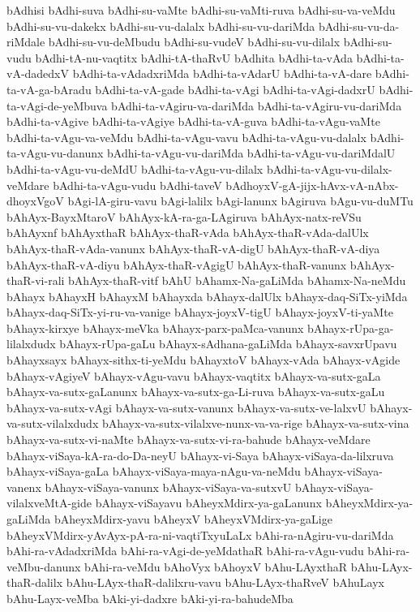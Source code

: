 {bAdhisi
bAdhi-suva
bAdhi-su-vaMte
bAdhi-su-vaMti-ruva
bAdhi-su-va-veMdu
bAdhi-su-vu-dakekx
bAdhi-su-vu-dalalx
bAdhi-su-vu-dariMda
bAdhi-su-vu-da-riMdale
bAdhi-su-vu-deMbudu
bAdhi-su-vudeV
bAdhi-su-vu-dilalx
bAdhi-su-vudu
bAdhi-tA-nu-vaqtitx
bAdhi-tA-thaRvU
bAdhita
bAdhi-ta-vAda
bAdhi-ta-vA-dadedxV
bAdhi-ta-vAdadxriMda
bAdhi-ta-vAdarU
bAdhi-ta-vA-dare
bAdhi-ta-vA-ga-bAradu
bAdhi-ta-vA-gade
bAdhi-ta-vAgi
bAdhi-ta-vAgi-dadxrU
bAdhi-ta-vAgi-de-yeMbuva
bAdhi-ta-vAgiru-va-dariMda
bAdhi-ta-vAgiru-vu-dariMda
bAdhi-ta-vAgive
bAdhi-ta-vAgiye
bAdhi-ta-vA-guva
bAdhi-ta-vAgu-vaMte
bAdhi-ta-vAgu-va-veMdu
bAdhi-ta-vAgu-vavu
bAdhi-ta-vAgu-vu-dalalx
bAdhi-ta-vAgu-vu-danunx
bAdhi-ta-vAgu-vu-dariMda
bAdhi-ta-vAgu-vu-dariMdalU
bAdhi-ta-vAgu-vu-deMdU
bAdhi-ta-vAgu-vu-dilalx
bAdhi-ta-vAgu-vu-dilalx-veMdare
bAdhi-ta-vAgu-vudu
bAdhi-taveV
bAdhoyxV-gA-jijx-hAvx-vA-nAbx-dhoyxVgoV
bAgi-lA-giru-vavu
bAgi-lalilx
bAgi-lanunx
bAgiruva
bAgu-vu-duMTu
bAhAyx-BayxMtaroV
bAhAyx-kA-ra-ga-LAgiruva
bAhAyx-natx-reVSu
bAhAyxnf
bAhAyxthaR
bAhAyx-thaR-vAda
bAhAyx-thaR-vAda-dalUlx
bAhAyx-thaR-vAda-vanunx
bAhAyx-thaR-vA-digU
bAhAyx-thaR-vA-diya
bAhAyx-thaR-vA-diyu
bAhAyx-thaR-vAgigU
bAhAyx-thaR-vanunx
bAhAyx-thaR-vi-rali
bAhAyx-thaR-vitf
bAhU
bAhamx-Na-gaLiMda
bAhamx-Na-neMdu
bAhayx
bAhayxH
bAhayxM
bAhayxda
bAhayx-dalUlx
bAhayx-daq-SiTx-yiMda
bAhayx-daq-SiTx-yi-ru-va-vanige
bAhayx-joyxV-tigU
bAhayx-joyxV-ti-yaMte
bAhayx-kirxye
bAhayx-meVka
bAhayx-parx-paMca-vanunx
bAhayx-rUpa-ga-lilalxdudx
bAhayx-rUpa-gaLu
bAhayx-sAdhana-gaLiMda
bAhayx-savxrUpavu
bAhayxsayx
bAhayx-sithx-ti-yeMdu
bAhayxtoV
bAhayx-vAda
bAhayx-vAgide
bAhayx-vAgiyeV
bAhayx-vAgu-vavu
bAhayx-vaqtitx
bAhayx-va-sutx-gaLa
bAhayx-va-sutx-gaLanunx
bAhayx-va-sutx-ga-Li-ruva
bAhayx-va-sutx-gaLu
bAhayx-va-sutx-vAgi
bAhayx-va-sutx-vanunx
bAhayx-va-sutx-ve-lalxvU
bAhayx-va-sutx-vilalxdudx
bAhayx-va-sutx-vilalxve-nunx-va-va-rige
bAhayx-va-sutx-vina
bAhayx-va-sutx-vi-naMte
bAhayx-va-sutx-vi-ra-bahude
bAhayx-veMdare
bAhayx-viSaya-kA-ra-do-Da-neyU
bAhayx-vi-Saya
bAhayx-viSaya-da-lilxruva
bAhayx-viSaya-gaLa
bAhayx-viSaya-maya-nAgu-va-neMdu
bAhayx-viSaya-vanenx
bAhayx-viSaya-vanunx
bAhayx-viSaya-va-sutxvU
bAhayx-viSaya-vilalxveMtA-gide
bAhayx-viSayavu
bAheyxMdirx-ya-gaLanunx
bAheyxMdirx-ya-gaLiMda
bAheyxMdirx-yavu
bAheyxV
bAheyxVMdirx-ya-gaLige
bAheyxVMdirx-yAvAyx-pA-ra-ni-vaqtiTxyuLaLx
bAhi-ra-nAgiru-vu-dariMda
bAhi-ra-vAdadxriMda
bAhi-ra-vAgi-de-yeMdathaR
bAhi-ra-vAgu-vudu
bAhi-ra-veMbu-danunx
bAhi-ra-veMdu
bAhoVyx
bAhoyxV
bAhu-LAyxthaR
bAhu-LAyx-thaR-dalilx
bAhu-LAyx-thaR-dalilxru-vavu
bAhu-LAyx-thaRveV
bAhuLayx
bAhu-Layx-veMba
bAki-yi-dadxre
bAki-yi-ra-bahudeMba
}
